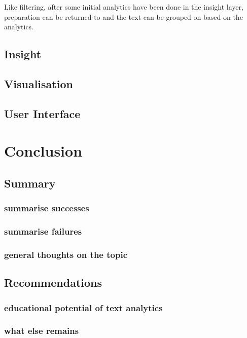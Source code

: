 \documentclass[11pt, a4paper, oneside]{report}
\begin{document}
Like filtering, after some initial analytics have been done in the
insight layer, preparation can be returned to and the text can be
grouped on based on the analytics.
\section{Insight}
\label{sec:insight}

\section{Visualisation}
\label{sec:visualisation}

\section{User Interface}
\label{sec:user-interface}

\chapter{Conclusion}
\label{cha:conclusion}

\section{Summary}
\label{sec:summary}

\subsection{summarise successes}
\subsection{summarise failures}
\subsection{general thoughts on the topic}

\section{Recommendations}
\label{sec:recommendations}

\subsection{educational potential of text analytics}
\subsection{what else remains}
\end{document}

